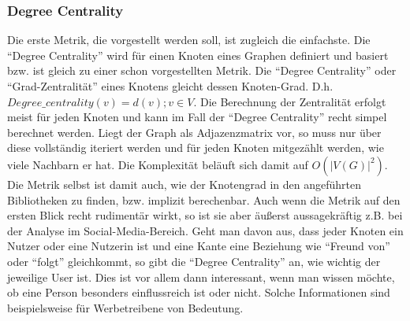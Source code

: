 \documentclass[a4paper,12pt,ngerman,chapterprefix=false,listof=totoc,bibliography=totoc]{scrreprt}
\begin{document}
\subsubsection*{Degree Centrality}
{
Die erste Metrik, die vorgestellt werden soll, ist zugleich die einfachste. Die "`Degree Centrality"' wird für einen Knoten eines Graphen definiert und basiert bzw. ist gleich zu einer schon vorgestellten Metrik. Die "`Degree Centrality"' oder "`Grad-Zentralität"' eines Knotens gleicht dessen Knoten-Grad. D.h. \(Degree\_centrality(v) = d(v); v \in V\). Die Berechnung der Zentralität erfolgt meist für jeden Knoten und kann im Fall der "`Degree Centrality"' recht simpel berechnet werden. Liegt der Graph als Adjazenzmatrix vor, so muss nur über diese vollständig iteriert werden und für jeden Knoten mitgezählt werden, wie viele Nachbarn er hat. Die Komplexität beläuft sich damit auf \(O(|V(G)|^2)\). Die Metrik selbst ist damit auch, wie der Knotengrad in den angeführten Bibliotheken zu finden, bzw. implizit berechenbar.  Auch wenn die Metrik auf den ersten Blick recht rudimentär wirkt, so ist sie aber äußerst aussagekräftig z.B. bei der Analyse im Social-Media-Bereich. Geht man davon aus, dass jeder Knoten ein Nutzer oder eine Nutzerin ist und eine Kante eine Beziehung wie "`Freund von"' oder "`folgt"' gleichkommt, so gibt die "`Degree Centrality"' an, wie wichtig der jeweilige User ist. Dies ist vor allem dann interessant, wenn man wissen möchte, ob eine Person besonders einflussreich ist oder nicht. Solche Informationen sind beispielsweise für Werbetreibene von Bedeutung. \cite{bhasin_graph_2019}
}
\end{document}
